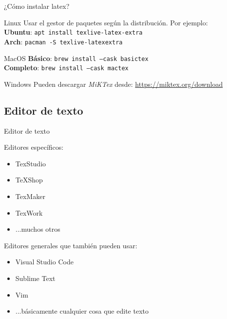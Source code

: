 \begin{frame}{¿Cómo instalar latex?}

\begin{block}{Linux}
  Usar el gestor de paquetes según la distribución. Por ejemplo:\\[2mm]
  \textbf{Ubuntu}: \texttt{apt install texlive-latex-extra}\\
  \textbf{Arch}: \texttt{pacman -S texlive-latexextra}\\
\end{block}

\pause

\begin{block}{MacOS}
  \textbf{Básico}: \texttt{brew install --cask basictex}\\
  \textbf{Completo}: \texttt{brew install --cask mactex}\\
\end{block}

\pause

\begin{block}{Windows}
  Pueden descargar \emph{MiKTex} desde: \url{https://miktex.org/download}
\end{block}
\end{frame}

\subsection{Editor de texto}

\begin{frame}{Editor de texto}

Editores específicos:

\begin{itemize}
  \item TexStudio
  \item TeXShop
  \item TexMaker
  \item TexWork
  \item ...muchos otros
\end{itemize}

\pause

Editores generales que también pueden usar:

\begin{itemize}
  \item Visual Studio Code
  \item Sublime Text
  \item Vim
  \item ...básicamente cualquier cosa que edite texto
\end{itemize}

\end{frame}

